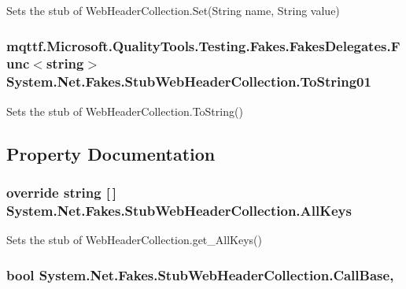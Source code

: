 Sets the stub of Web\-Header\-Collection.\-Set(\-String name, String value)

\hypertarget{class_system_1_1_net_1_1_fakes_1_1_stub_web_header_collection_aeddf74c1f4f3b099560d1920d55f80ce}{
\subsubsection[{To\-String01}]{\setlength{\rightskip}{0pt plus 5cm}mqttf.\-Microsoft.\-Quality\-Tools.\-Testing.\-Fakes.\-Fakes\-Delegates.\-Func$<$string$>$ System.\-Net.\-Fakes.\-Stub\-Web\-Header\-Collection.\-To\-String01}}\label{class_system_1_1_net_1_1_fakes_1_1_stub_web_header_collection_aeddf74c1f4f3b099560d1920d55f80ce}


Sets the stub of Web\-Header\-Collection.\-To\-String()



\subsection{Property Documentation}
\hypertarget{class_system_1_1_net_1_1_fakes_1_1_stub_web_header_collection_a5d26cfd7a154ee368b3f6d3ce3a7feea}{
\subsubsection[{All\-Keys}]{\setlength{\rightskip}{0pt plus 5cm}override string \mbox{[}$\,$\mbox{]} System.\-Net.\-Fakes.\-Stub\-Web\-Header\-Collection.\-All\-Keys\hspace{0.3cm}{\ttfamily [get]}}}\label{class_system_1_1_net_1_1_fakes_1_1_stub_web_header_collection_a5d26cfd7a154ee368b3f6d3ce3a7feea}


Sets the stub of Web\-Header\-Collection.\-get\-\_\-\-All\-Keys()

\hypertarget{class_system_1_1_net_1_1_fakes_1_1_stub_web_header_collection_a9b456f161169cb46f3255a7677e12a6f}{
\subsubsection[{Call\-Base}]{\setlength{\rightskip}{0pt plus 5cm}bool System.\-Net.\-Fakes.\-Stub\-Web\-Header\-Collection.\-Call\-Base\hspace{0.3cm}{\ttfamily [get]}, {\ttfamily [set]}}}\label{class_system_1_1_net_1_1_fakes_1_1_stub_web_header_collection_a9b456f161169cb46f3255a7677e12a6f}


